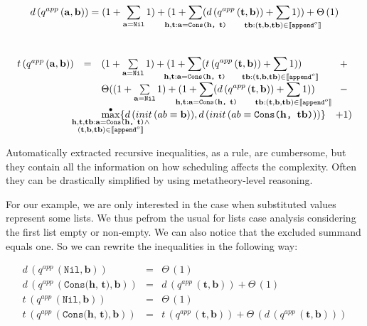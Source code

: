 \[
d\,(q^{app}\,(\mathbf{a}, \mathbf{b}))  = (1 + \sum\limits_{\mathbf{a} = \texttt{Nil}} 1) + (1 + \smashoperator{\sum\limits_{\mathbf{h}, \mathbf{t}: \mathbf{a} = \texttt{Cons($\mathbf{h}$, $\mathbf{t}$)}}} (d\,(q^{app}\,(\mathbf{t}, \mathbf{b})) + \smashoperator{\sum\limits_{\mathbf{tb} : (\mathbf{t}, \mathbf{b}, \mathbf{tb}) \in \llbracket \texttt{append$^o$} \rrbracket}} 1)) + \Theta\,(1)
\]\\[0.8mm]
\[
\begin{array}{lclc}
t\,(q^{app}\,(\mathbf{a}, \mathbf{b})) & = & (1 + \sum\limits_{\mathbf{a} = \texttt{Nil}} 1) + (1 + \smashoperator{\sum\limits_{\mathbf{h}, \mathbf{t}: \mathbf{a} = \texttt{Cons($\mathbf{h}$, $\mathbf{t}$)}}} (t\,(q^{app}\,(\mathbf{t}, \mathbf{b})) + \smashoperator{\sum\limits_{\mathbf{tb} : (\mathbf{t}, \mathbf{b}, \mathbf{tb}) \in \llbracket \texttt{append$^o$} \rrbracket}} 1)) & + \\
 & &\Theta((1 + \sum\limits_{\mathbf{a} = \texttt{Nil}} 1) + (1 + \smashoperator{\sum\limits_{\mathbf{h}, \mathbf{t}: \mathbf{a} = \texttt{Cons($\mathbf{h}$, $\mathbf{t}$)}}} (d\,(q^{app}\,(\mathbf{t}, \mathbf{b})) + \smashoperator{\sum\limits_{\mathbf{tb} : (\mathbf{t}, \mathbf{b}, \mathbf{tb}) \in \llbracket \texttt{append$^o$} \rrbracket}} 1)) & - \\
& & \smashoperator{\maxd\limits_{\substack{
                                   \mathbf{h}, \mathbf{t}, \mathbf{tb}: \mathbf{a} = \texttt{Cons($\mathbf{h}$, $\mathbf{t}$)} \land \\
                                   (\mathbf{t}, \mathbf{b}, \mathbf{tb}) \in \llbracket \texttt{append$^o$} \rrbracket
                                 }
                                }} \{ d\,(init\,(\unigoal{ab}{\mathbf{b}})), d\,(init\,(\unigoal{ab}{\texttt{Cons($\mathbf{h}$, $\mathbf{tb}$)}})) \} & + 1) 
\end{array}
\]


Automatically extracted recursive inequalities, as a rule, are cumbersome, but they contain all the information on how scheduling affects the complexity.
Often they can be drastically simplified by using metatheory-level reasoning.

For our example, we are only interested in the case when substituted values represent some lists. We thus pefrom the usual for lists case analysis
considering the first list empty or non-empty. We can also notice that the excluded summand equals one. So we can rewrite the inequalities in the following way:

\[
\begin{array}{lcl}
d\,(q^{app}\,(\texttt{Nil}, \mathbf{b})) & = & \Theta\,(1) \\
d\,(q^{app}\,(\texttt{Cons($\mathbf{h}$, $\mathbf{t}$)}, \mathbf{b})) & = & d\,(q^{app}\,(\mathbf{t}, \mathbf{b})) + \Theta\,(1) \\
t\,(q^{app}\,(\texttt{Nil}, \mathbf{b})) & = & \Theta\,(1) \\
t\,(q^{app}\,(\texttt{Cons($\mathbf{h}$, $\mathbf{t}$)}, \mathbf{b})) & = & t\,(q^{app}\,(\mathbf{t}, \mathbf{b})) + \Theta\,(d\,(q^{app}\,(\mathbf{t}, \mathbf{b}))) \\
\end{array}
 \]
 
